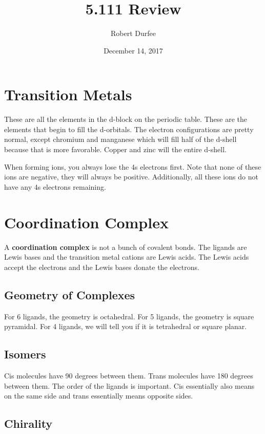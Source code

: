 \documentclass{article}
\title{ 5.111 Review }
\author{ Robert Durfee }
\date{ December 14, 2017 }
\begin{document}
\maketitle

\section{ Transition Metals }

These are all the elements in the d-block on the periodic table. These are the
elements that begin to fill the d-orbitals. The electron configurations are
pretty normal, except chromium and manganese which will fill half of the d-shell
because that is more favorable. Copper and zinc  will the entire d-shell.

When forming ions, you always lose the 4s electrons first. Note that none of
these ions are negative, they will always be positive. Additionally, all these
ions do not have any 4s electrons remaining.

\section{Coordination Complex}

A \textbf{coordination complex} is not a bunch of covalent bonds. The ligands are
Lewis bases and the transition metal cations are Lewis acids. The Lewis acids
accept the electrons and the Lewis bases donate the electrons.

\subsection{Geometry of Complexes}

For 6 ligands, the geometry is octahedral. For 5 ligands, the geometry is square
pyramidal. For 4 ligands, we will tell you if it is tetrahedral or square
planar.

\subsection{Isomers}

Cis molecules have 90 degrees between them. Trans molecules have 180 degrees
between them. The order of the ligands is important. Cis essentially also means
on the same side and trans essentially means opposite sides.

\subsection{Chirality}
\end{document}
